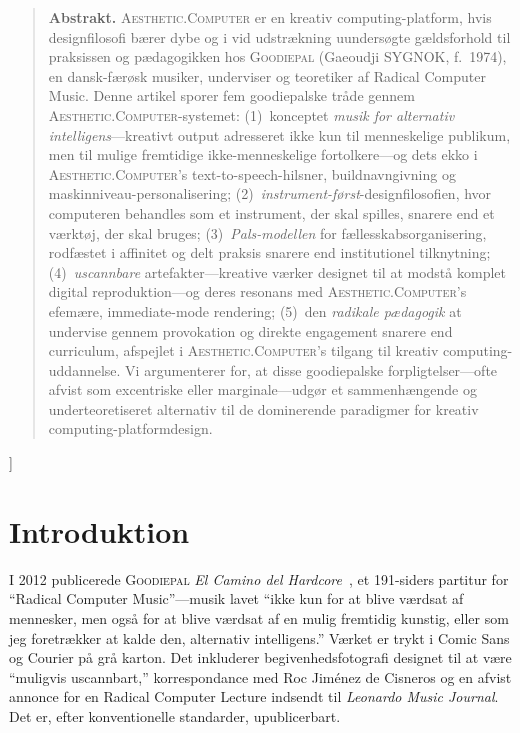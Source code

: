 \documentclass[10pt,letterpaper,twocolumn]{article}
\newcommand{\ac}{\textsc{Aesthetic.Computer}}
\newcommand{\gp}{\textsc{Goodiepal}}
\begin{document}
{\begin{quote}
\small\noindent\textbf{Abstrakt.}
\ac{} er en kreativ computing-platform, hvis designfilosofi bærer dybe og i vid udstrækning uundersøgte gældsforhold til praksissen og pædagogikken hos \gp{} (Gaeoudji SYGNOK, f.~1974), en dansk-færøsk musiker, underviser og teoretiker af Radical Computer Music. Denne artikel sporer fem goodiepalske tråde gennem \ac{}-systemet: (1)~konceptet \emph{musik for alternativ intelligens}---kreativt output adresseret ikke kun til menneskelige publikum, men til mulige fremtidige ikke-menneskelige fortolkere---og dets ekko i \ac{}'s text-to-speech-hilsner, buildnavngivning og maskinniveau-personalisering; (2)~\emph{instrument-først}-designfilosofien, hvor computeren behandles som et instrument, der skal spilles, snarere end et værktøj, der skal bruges; (3)~\emph{Pals-modellen} for fællesskabsorganisering, rodfæstet i affinitet og delt praksis snarere end institutionel tilknytning; (4)~\emph{uscannbare} artefakter---kreative værker designet til at modstå komplet digital reproduktion---og deres resonans med \ac{}'s efemære, immediate-mode rendering; (5)~den \emph{radikale pædagogik} at undervise gennem provokation og direkte engagement snarere end curriculum, afspejlet i \ac{}'s tilgang til kreativ computing-uddannelse. Vi argumenterer for, at disse goodiepalske forpligtelser---ofte afvist som excentriske eller marginale---udgør et sammenhængende og underteoretiseret alternativ til de dominerende paradigmer for kreativ computing-platformdesign.
\end{quote}
\vspace{0.5em}
}]

\section{Introduktion}

I 2012 publicerede \gp{} \emph{El Camino del Hardcore}~\citep{goodiepal2012elcamino}, et 191-siders partitur for ``Radical Computer Music''---musik lavet ``ikke kun for at blive værdsat af mennesker, men også for at blive værdsat af en mulig fremtidig kunstig, eller som jeg foretrækker at kalde den, alternativ intelligens.'' Værket er trykt i Comic Sans og Courier på grå karton. Det inkluderer begivenhedsfotografi designet til at være ``muligvis uscannbart,'' korrespondance med Roc Jim\'enez de Cisneros og en afvist annonce for en Radical Computer Lecture indsendt til \emph{Leonardo Music Journal}. Det er, efter konventionelle standarder, upublicerbart.
\end{document}
